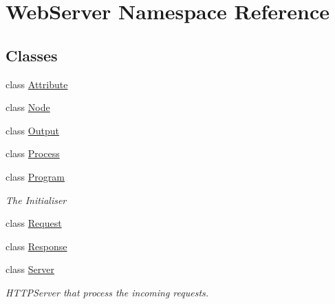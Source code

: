 \hypertarget{namespace_web_server}{}\section{Web\+Server Namespace Reference}
\label{namespace_web_server}
\subsection*{Classes}
\begin{DoxyCompactItemize}
\item 
class \hyperlink{class_web_server_1_1_attribute}{Attribute}
\item 
class \hyperlink{class_web_server_1_1_node}{Node}
\item 
class \hyperlink{class_web_server_1_1_output}{Output}
\item 
class \hyperlink{class_web_server_1_1_process}{Process}
\item 
class \hyperlink{class_web_server_1_1_program}{Program}
\begin{DoxyCompactList}\small\item\em The Initialiser \end{DoxyCompactList}\item 
class \hyperlink{class_web_server_1_1_request}{Request}
\item 
class \hyperlink{class_web_server_1_1_response}{Response}
\item 
class \hyperlink{class_web_server_1_1_server}{Server}
\begin{DoxyCompactList}\small\item\em H\+T\+T\+P\+Server that process the incoming requests. \end{DoxyCompactList}\end{DoxyCompactItemize}
